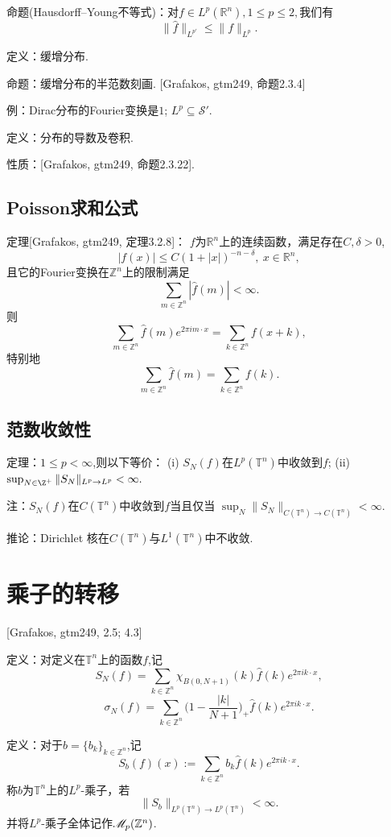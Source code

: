 命题(Hausdorff--Young不等式)：对$f\in L^p(\mathbb{R}^n),1\leq p\leq 2,$我们有
$$\|\hat{f} \|_{L^{p'}}\leq \|f\|_{L^p}.$$

定义：缓增分布.

命题：缓增分布的半范数刻画. [Grafakos, gtm249, 命题2.3.4]

例：Dirac分布的Fourier变换是$1$; $L^p \subseteq \mathscr{S}'$.

定义：分布的导数及卷积.

性质：[Grafakos, gtm249, 命题2.3.22].

\subsection{Poisson求和公式}
定理[Grafakos, gtm249, 定理3.2.8]：
$f$为$\mathbb{R}^n$上的连续函数，满足存在$C,\delta>0$,
$$|f(x)|\leq C(1+|x|)^{-n-\delta},\ x\in \mathbb{R}^n,$$
且它的Fourier变换在$\mathbb{Z}^n$上的限制满足
$$\sum _{m\in \mathbb{Z}^n}|\hat{f}(m)| <\infty.$$
则
$$\sum_{m\in \mathbb{Z}^n} \hat{f}(m)e^{2\pi im\cdot x}
=\sum_{k\in \mathbb{Z}^n}f(x+k),$$
特别地$$\sum_{m\in \mathbb{Z}^n} \hat{f}(m)=\sum_{k\in \mathbb{Z}^n}f(k).$$

\subsection{范数收敛性}
定理：$1\leq p<\infty$,则以下等价：
(i) $S_N(f)$在$L^p(\mathbb{T}^n)$中收敛到$f$;
(ii) $\sup_{N\in\Z^+}\|S_N\|_{L^p\to L^p}<\infty.$

注：$S_N(f)$在$C(\mathbb{T}^n)$中收敛到$f$当且仅当
$\sup_{N}\|S_N\|_{C(\mathbb{T}^n)\to C(\mathbb{T}^n)}<\infty$.

推论：Dirichlet 核在$C(\mathbb{T}^n)$与$L^1(\mathbb{T}^n)$中不收敛.

\section{乘子的转移}
[Grafakos, gtm249, 2.5; 4.3]

定义：对定义在$\mathbb{T}^n$上的函数$f$,记
$$S_N(f)=\sum_{k\in \mathbb{Z}^n}\chi_{B(0,N+1)}(k)\hat{f}(k)e^{2\pi ik\cdot x},$$
$$\sigma_N(f)=\sum_{k\in \mathbb{Z}^n}\Big(1-\frac{|k|}{N+1}\Big)_+\hat{f}(k)e^{2\pi ik\cdot x}.$$

定义：对于$b=\{ b_k \}_{k\in \mathbb{Z}^n}$,记
$$S_b(f)(x):=\sum_{k\in \mathbb{Z}^n}b_k \hat{f}(k)e^{2\pi ik\cdot x}.$$
称$b$为$\mathbb{T}^n$上的$L^p$-乘子，若
$$\|S_b\|_{L^p(\mathbb{T}^n)\to L^p(\mathbb{T}^n)}<\infty.$$
并将$L^p$-乘子全体记作$\mathscr{M}_p(\mathbb{Z}^n)$.

